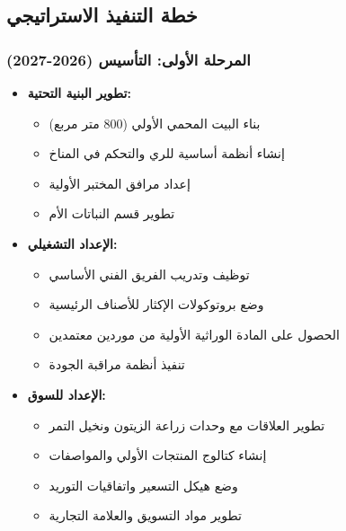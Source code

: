 \subsection{خطة التنفيذ الاستراتيجي}

\subsubsection{المرحلة الأولى: التأسيس (2026-2027)}
\begin{itemize}
    \item \textbf{تطوير البنية التحتية:}
    \begin{itemize}
        \item بناء البيت المحمي الأولي (800 متر مربع)
        \item إنشاء أنظمة أساسية للري والتحكم في المناخ
        \item إعداد مرافق المختبر الأولية
        \item تطوير قسم النباتات الأم
    \end{itemize}
    
    \item \textbf{الإعداد التشغيلي:}
    \begin{itemize}
        \item توظيف وتدريب الفريق الفني الأساسي
        \item وضع بروتوكولات الإكثار للأصناف الرئيسية
        \item الحصول على المادة الوراثية الأولية من موردين معتمدين
        \item تنفيذ أنظمة مراقبة الجودة
    \end{itemize}
    
    \item \textbf{الإعداد للسوق:}
    \begin{itemize}
        \item تطوير العلاقات مع وحدات زراعة الزيتون ونخيل التمر
        \item إنشاء كتالوج المنتجات الأولي والمواصفات
        \item وضع هيكل التسعير واتفاقيات التوريد
        \item تطوير مواد التسويق والعلامة التجارية
    \end{itemize}
\end{itemize}

